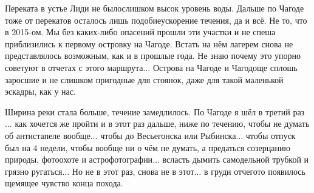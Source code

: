 Переката в устье Лиди не было\mdash слишком высок уровень воды. Дальше по Чагоде тоже от перекатов осталось лишь подобие\mdash ускорение течения, да и всё. Не то, что в 2015-ом. Мы без каких-либо опасений прошли эти участки и не спеша приблизились к первому островку на Чагоде. Встать на нём лагерем снова не представлялось возможным, как и в прошлые года. Не знаю почему это упорно советуют в отчетах с этого маршрута$\ldots$ Острова на Чагоде и Чагодоще сплошь заросшие и не слишком пригодные для стоянок, даже для такой маленькой эскадры, как у нас.

Ширина реки стала больше, течение замедлилось. По Чагоде я шёл в третий раз$\ldots$ как хочется же пройти и в этот раз дальше, ниже по течению, чтобы не думать об антистапеле вообще$\ldots$ чтобы до Весьегонска или Рыбинска$\ldots$ чтобы отпуск был на 4 недели, чтобы вообще ни о чём не думать, а предаться созерцанию природы, фотоохоте и астрофотографии$\ldots$ всласть дымить самодельной трубкой и грязно ругаться$\ldots$ Но не в этот раз, снова не в этот$\ldots$ в груди отчего\sdash то появилось щемящее чувство конца похода.

\begin{center}
\end{center}

